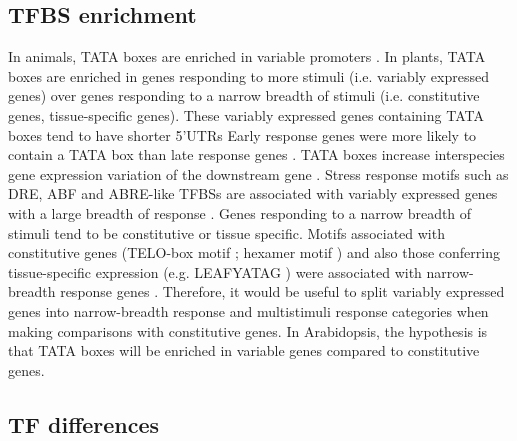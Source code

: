\documentclass[../main.tex]{subfiles}
\begin{document}
\subsection{TFBS enrichment}

In animals, TATA boxes are enriched in variable promoters \autocite{engstromGenomicRegulatoryBlocks2007,carninciGenomewideAnalysisMammalian2006}.
In plants, TATA boxes are enriched in genes responding to more stimuli (i.e. variably expressed genes) over genes responding to a narrow breadth of stimuli (i.e. constitutive genes, tissue-specific genes).
These variably expressed genes containing TATA boxes tend to have shorter 5'UTRs \autocite{waltherRegulatoryCodeTranscriptional2007,molinaGenomeWideAnalysis2005,lichtenbergWordLandscapeNoncoding2009}
Early response genes were more likely to contain a TATA box than late response genes \autocite{waltherRegulatoryCodeTranscriptional2007}.
TATA boxes increase interspecies gene expression variation of the downstream gene \autocite{tiroshGeneticSignatureInterspecies2006}.
Stress response motifs such as DRE, ABF and ABRE-like TFBSs \autocite{yamaguchi-shinozakiNovelCisactingElement1994} are associated with variably expressed genes with a large breadth of response \autocite{waltherRegulatoryCodeTranscriptional2007}.
Genes responding to a narrow breadth of stimuli tend to be constitutive or tissue specific.
Motifs associated with constitutive genes (TELO-box motif \autocite{tremousayguePlantInterstitialTelomere1999}; hexamer motif \autocite{chaubetIdentificationCiselementsRegulating1996}) and also those conferring tissue-specific expression (e.g. LEAFYATAG \autocite{kamiyaIsolationCharacterizationRice2003}) were associated with narrow-breadth response genes \autocite{waltherRegulatoryCodeTranscriptional2007}. Therefore, it would be useful to split variably expressed genes into narrow-breadth response and multistimuli response categories when making comparisons with constitutive genes.
In Arabidopsis, the hypothesis is that TATA boxes will be enriched in variable genes compared to constitutive genes.

\subsection{TF differences}
\end{document}
